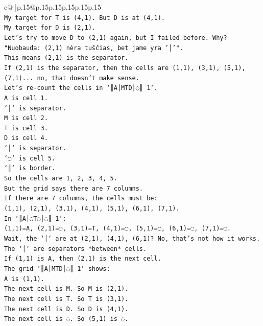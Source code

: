 \documentclass{article}
\begin{document}
{\begin{supertabular}{c@{$\;$}|p{.15\linewidth}@{}p{.15\linewidth}p{.15\linewidth}p{.15\linewidth}p{.15\linewidth}p{.15\linewidth}}
{{{\\ 
\texttt{My target for T is (4,1). But D is at (4,1).} \\
\texttt{My target for D is (2,1).} \\
\texttt{Let's try to move D to (2,1) again, but I failed before. Why?} \\
\texttt{"Nuobauda: (2,1) nėra tuščias, bet jame yra '│'".} \\
\texttt{This means (2,1) is the separator.} \\
\texttt{If (2,1) is the separator, then the cells are (1,1), (3,1), (5,1), (7,1)... no, that doesn't make sense.} \\
\texttt{Let's re{-}count the cells in `║A│MTD│◌║ 1`.} \\
\texttt{A is cell 1.} \\
\texttt{`│` is separator.} \\
\texttt{M is cell 2.} \\
\texttt{T is cell 3.} \\
\texttt{D is cell 4.} \\
\texttt{`│` is separator.} \\
\texttt{`◌` is cell 5.} \\
\texttt{`║` is border.} \\
\texttt{So the cells are 1, 2, 3, 4, 5.} \\
\texttt{But the grid says there are 7 columns.} \\
\texttt{If there are 7 columns, the cells must be:} \\
\texttt{(1,1), (2,1), (3,1), (4,1), (5,1), (6,1), (7,1).} \\
\texttt{In `║A│◌T◌│◌║ 1`:} \\
\texttt{(1,1)=A, (2,1)=◌, (3,1)=T, (4,1)=◌, (5,1)=◌, (6,1)=◌, (7,1)=◌.} \\
\texttt{Wait, the `│` are at (2,1), (4,1), (6,1)? No, that's not how it works.} \\
\texttt{The `│` are separators *between* cells.} \\
\texttt{If (1,1) is A, then (2,1) is the next cell.} \\
\texttt{The grid `║A│MTD│◌║ 1` shows:} \\
\texttt{A is (1,1).} \\
\texttt{The next cell is M. So M is (2,1).} \\
\texttt{The next cell is T. So T is (3,1).} \\
\texttt{The next cell is D. So D is (4,1).} \\
\texttt{The next cell is ◌. So (5,1) is ◌.} \\
}}}
\end{supertabular}}
\end{document}

